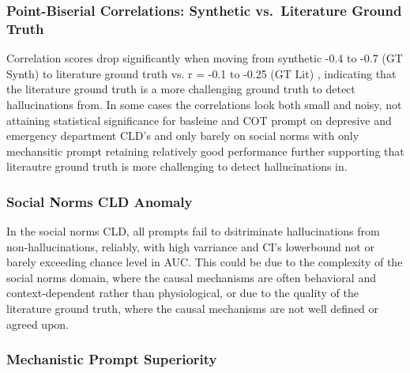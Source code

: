 \subsubsection{Point-Biserial Correlations: Synthetic vs.\ Literature Ground Truth}

Correlation scores drop significantly when moving from synthetic -0.4 to -0.7 (GT Synth) to literature ground truth vs. r = -0.1 to -0.25 (GT Lit) , indicating that the literature ground truth is a more challenging ground truth to detect hallucinations from. In some cases the correlations look both small and noisy, not attaining statistical significance for basleine and COT prompt on depresive and emergency department CLD's and only barely on social norms with only mechansitic prompt retaining relatively good performance further supporting that literautre ground truth is more challenging to detect hallucinations in.
\subsubsection{Social Norms CLD Anomaly}

In the social norms CLD, all prompts fail to dsitriminate hallucinations from non-hallucinations, reliably, with high varriance and CI's lowerbound not or barely exceeding chance level in AUC. This could be due to the complexity of the social norms domain, where the causal mechanisms are often behavioral and context-dependent rather than physiological, or due to the quality of the literature ground truth, where the causal mechanisms are not well defined or agreed upon.

\subsubsection{Mechanistic Prompt Superiority}

